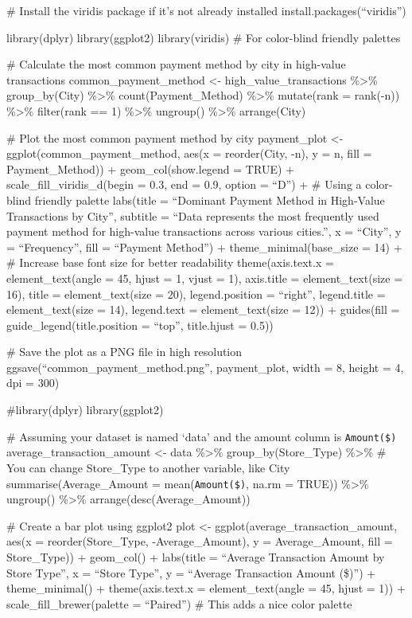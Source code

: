 \documentclass[
]{article}
\begin{document}
\# Install the viridis package if it's not already installed
install.packages(``viridis'')

library(dplyr) library(ggplot2) library(viridis) \# For color-blind
friendly palettes

\# Calculate the most common payment method by city in high-value
transactions common\_payment\_method \textless-
high\_value\_transactions \%\textgreater\% group\_by(City)
\%\textgreater\% count(Payment\_Method) \%\textgreater\% mutate(rank =
rank(-n)) \%\textgreater\% filter(rank == 1) \%\textgreater\% ungroup()
\%\textgreater\% arrange(City)

\# Plot the most common payment method by city payment\_plot \textless-
ggplot(common\_payment\_method, aes(x = reorder(City, -n), y = n, fill =
Payment\_Method)) + geom\_col(show.legend = TRUE) +
scale\_fill\_viridis\_d(begin = 0.3, end = 0.9, option = ``D'') + \#
Using a color-blind friendly palette labs(title = ``Dominant Payment
Method in High-Value Transactions by City'', subtitle = ``Data
represents the most frequently used payment method for high-value
transactions across various cities.'', x = ``City'', y = ``Frequency'',
fill = ``Payment Method'') + theme\_minimal(base\_size = 14) + \#
Increase base font size for better readability theme(axis.text.x =
element\_text(angle = 45, hjust = 1, vjust = 1), axis.title =
element\_text(size = 16), title = element\_text(size = 20),
legend.position = ``right'', legend.title = element\_text(size = 14),
legend.text = element\_text(size = 12)) + guides(fill =
guide\_legend(title.position = ``top'', title.hjust = 0.5))

\# Save the plot as a PNG file in high resolution
ggsave(``common\_payment\_method.png'', payment\_plot, width = 8, height
= 4, dpi = 300)

\#library(dplyr) library(ggplot2)

\# Assuming your dataset is named `data' and the amount column is
\texttt{Amount(\$)} average\_transaction\_amount \textless- data
\%\textgreater\% group\_by(Store\_Type) \%\textgreater\% \# You can
change Store\_Type to another variable, like City
summarise(Average\_Amount = mean(\texttt{Amount(\$)}, na.rm = TRUE))
\%\textgreater\% ungroup() \%\textgreater\%
arrange(desc(Average\_Amount))

\# Create a bar plot using ggplot2 plot \textless-
ggplot(average\_transaction\_amount, aes(x = reorder(Store\_Type,
-Average\_Amount), y = Average\_Amount, fill = Store\_Type)) +
geom\_col() + labs(title = ``Average Transaction Amount by Store Type'',
x = ``Store Type'', y = ``Average Transaction Amount (\$)'') +
theme\_minimal() + theme(axis.text.x = element\_text(angle = 45, hjust =
1)) + scale\_fill\_brewer(palette = ``Paired'') \# This adds a nice
color palette
\end{document}
